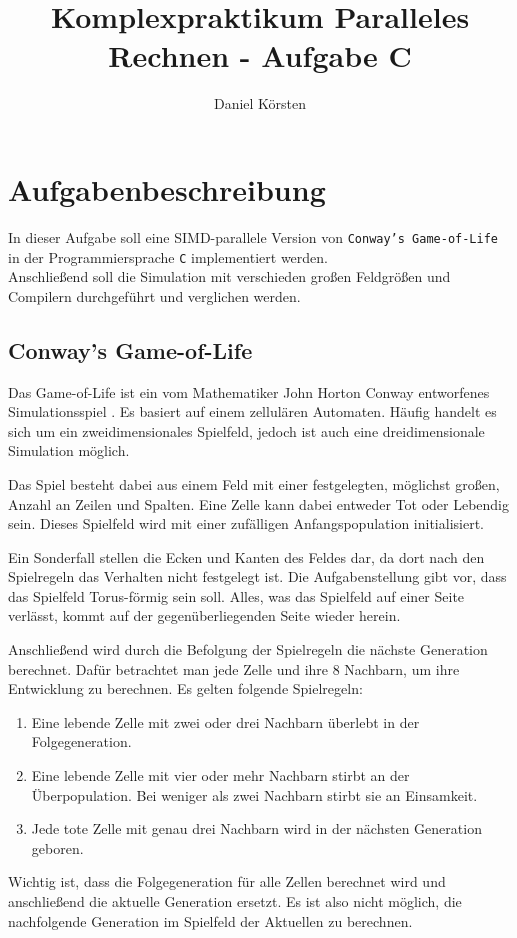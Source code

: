 \documentclass[german,plainarticle,hyperref,utf8]{zihpub}
\author{Daniel Körsten}
\title{Komplexpraktikum Paralleles Rechnen - Aufgabe C}
\begin{document}
	\section{Aufgabenbeschreibung}
	In dieser Aufgabe soll eine SIMD-parallele Version von \texttt{Conway’s Game-of-Life} in der Programmiersprache \texttt{C} implementiert werden.\\
	Anschließend soll die Simulation mit verschieden großen Feldgrößen und Compilern durchgeführt und verglichen werden.
	
	\subsection{Conway’s Game-of-Life}
	Das Game-of-Life ist ein vom Mathematiker John Horton Conway entworfenes Simulationsspiel \cite{gardner}. Es basiert auf einem zellulären Automaten. Häufig handelt es sich um ein zweidimensionales Spielfeld, jedoch ist auch eine dreidimensionale Simulation möglich.
	
	Das Spiel besteht dabei aus einem Feld mit einer festgelegten, möglichst großen, Anzahl an Zeilen und Spalten. Eine Zelle kann dabei entweder Tot oder Lebendig sein. Dieses Spielfeld wird mit einer zufälligen Anfangspopulation initialisiert.
	
	Ein Sonderfall stellen die Ecken und Kanten des Feldes dar, da dort nach den Spielregeln das Verhalten nicht festgelegt ist. Die Aufgabenstellung gibt vor, dass das Spielfeld Torus-förmig sein soll. Alles, was das Spielfeld auf einer Seite verlässt, kommt auf der gegenüberliegenden Seite wieder herein.
	
	Anschließend wird durch die Befolgung der Spielregeln die nächste Generation berechnet. Dafür betrachtet man jede Zelle und ihre 8 Nachbarn, um ihre Entwicklung zu berechnen. Es gelten folgende Spielregeln:
	\begin{enumerate}
		\item Eine lebende Zelle mit zwei oder drei Nachbarn überlebt in der Folgegeneration.
		\item Eine lebende Zelle mit vier oder mehr Nachbarn stirbt an der Überpopulation. Bei weniger als zwei Nachbarn stirbt sie an Einsamkeit.
		\item Jede tote Zelle mit genau drei Nachbarn wird in der nächsten Generation geboren.
	\end{enumerate}
	Wichtig ist, dass die Folgegeneration für alle Zellen berechnet wird und anschließend die aktuelle Generation ersetzt. Es ist also nicht möglich, die nachfolgende Generation im Spielfeld der Aktuellen zu berechnen.
	
\end{document}
